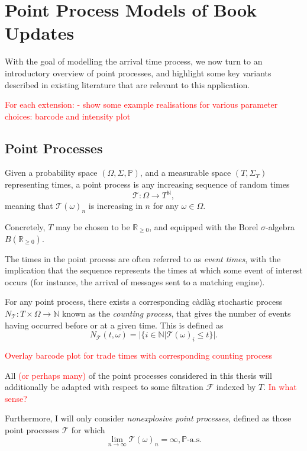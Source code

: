 \documentclass[honours,12pt]{unswthesis}
\numberwithin{equation}{section}
\begin{document}
\section{Point Process Models of Book Updates}
With the goal of modelling the arrival time process, we now turn to an introductory overview of point processes, and highlight some key variants described in existing literature that are relevant to this application.

\textcolor{red}{
For each extension:
- show some example realisations for various parameter choices: barcode and intensity plot
}


\subsection{Point Processes}
Given a probability space $(\Omega,\Sigma,\mathbb P)$, and a measurable space $(T,\Sigma_T)$ representing times, a point process is any increasing sequence of random times $$\mathcal T : \Omega\to T^\mathbb{N},$$
meaning that $\mathcal{T}(\omega)_n$ is increasing in $n$ for any $\omega\in\Omega$.

Concretely, $T$ may be chosen to be $\mathbb{R}_{\geq 0}$, and equipped with the Borel $\sigma$-algebra $B\left(\mathbb{R}_{\geq 0}\right)$.

The times in the point process are often referred to as \textit{event times}, with the implication that the sequence represents the times at which some event of interest occurs (for instance, the arrival of messages sent to a matching engine).

{\noindent}For any point process, there exists a corresponding càdlàg stochastic process $N_{\mathcal T}:T\times\Omega\to\mathbb{N}$ known as the \textit{counting process}, that gives the number of events having occurred before or at a given time. This is defined as
$$N_{\mathcal T}(t,\omega) = \vert \{i\in\mathbb N \vert \mathcal{T}(\omega)_i \leq t\} \vert.$$

\textcolor{red}{Overlay barcode plot for trade times with corresponding counting process}

All \textcolor{red}{(or perhaps many)} of the point processes considered in this thesis will additionally be adapted with respect to some filtration $\mathcal F$ indexed by $T$. \textcolor{red}{In what sense?}

Furthermore, I will only consider \textit{nonexplosive point processes}, defined as those point processes $\mathcal{T}$ for which
$$\lim_{n\to\infty}\mathcal{T}(\omega)_n=\infty, \mathbb{P}\text{-a.s.}$$
\end{document}
